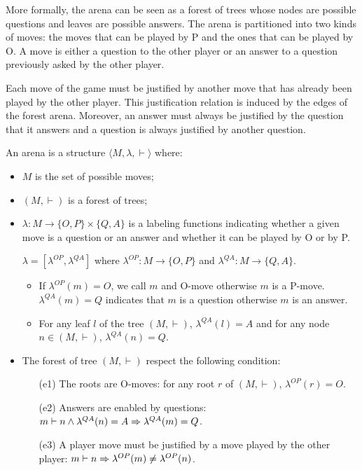 More formally, the arena can be seen as a forest of trees whose nodes are possible questions and leaves are possible answers.
The arena is partitioned into two kinds of moves: the moves that can be played by P and the ones that can be played by O.
A move is either a question to the other player or an answer to a question previously asked by the other player.

Each move of the game must be justified by another move that has already been played by the other player. This justification relation
is induced by the edges of the forest arena. Moreover, an answer must always be justified by the question that it answers and a question
is always justified by another question.

\begin{dfn}[Arena]
An arena is a structure $\langle M, \lambda, \vdash \rangle$ where:
\begin{itemize}
\item $M$ is the set of possible moves;
\item $(M,\vdash)$ is a forest of trees;

\item $\lambda : M \rightarrow \{ O, P\} \times \{Q, A\}$ is a labeling functions indicating whether a given move
    is a question or an answer and whether it can be played by O or by P.

    $\lambda = [\lambda^{OP},\lambda^{QA}]$ where $\lambda^{OP} : M \rightarrow  \{ O, P\}$
    and $\lambda^{QA} : M \rightarrow  \{ Q, A\}$.

    \begin{itemize}
    \item If $\lambda^{OP} (m) = O$, we call $m$ and O-move otherwise $m$ is a P-move.
    $\lambda^{QA} (m) = Q$ indicates that $m$ is a question otherwise $m$ is an answer.

    \item For any leaf $l$ of the tree $(M,\vdash)$, $\lambda^{QA} (l) = A$ and for any node
    $n \in (M,\vdash)$, $\lambda^{QA} (n) = Q$.
    \end{itemize}

\item The forest of tree $(M,\vdash)$ respect the following condition:
    \begin{itemize}
    \item[(e1)] The roots are O-moves: for any root $r$ of $(M,\vdash)$, $\lambda^{OP} (r) = O$.
    \item[(e2)] Answers are enabled by questions: $m \vdash n  \wedge \lambda^{QA}(n) = A \Rightarrow \lambda^{QA}(m) = Q$.
    \item[(e3)] A player move must be justified by a move played by the other player:
         $m\vdash n \Rightarrow \lambda^{OP}(m) \neq \lambda^{OP}(n)$.
    \end{itemize}
\end{itemize}
\end{dfn}

